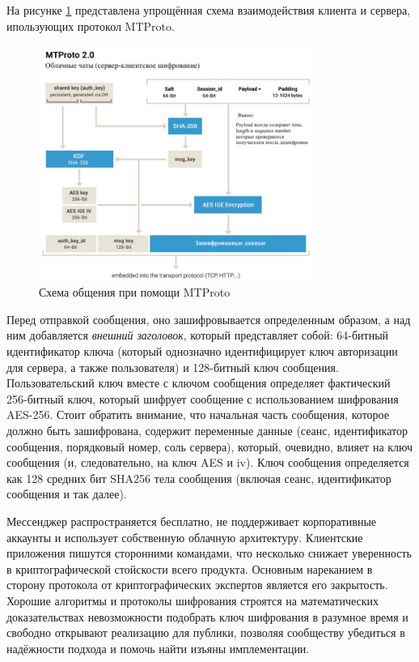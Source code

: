 На рисунке \ref{sec:analysis:research:analogs:telegram:mtproto1} представлена упрощённая схема взаимодействия клиента и сервера, ипользующих протокол MTProto.

\begin{figure}[h]
  \centering
    \includegraphics[width=0.8\textwidth]{inc/img/mtproto1.jpeg}
  \caption{Схема общения при помощи MTProto}
  \label{sec:analysis:research:analogs:telegram:mtproto1}
\end{figure}

Перед отправкой сообщения, оно зашифровывается определенным образом, а над ним добавляется \textit{внешний заголовок}, который представляет собой: 64-битный идентификатор ключа (который однозначно идентифицирует ключ авторизации для сервера, а также пользователя) и 128-битный ключ сообщения. Пользовательский ключ вместе с ключом сообщения определяет фактический 256-битный ключ, который шифрует сообщение с использованием шифрования AES-256. Стоит обратить внимание, что начальная часть сообщения, которое должно быть зашифрована, содержит переменные данные (сеанс, идентификатор сообщения, порядковый номер, соль сервера), который, очевидно, влияет на ключ сообщения (и, следовательно, на ключ AES и iv). Ключ сообщения определяется как 128 средних бит SHA256 тела сообщения (включая сеанс, идентификатор сообщения и так далее).

Мессенджер распространяется бесплатно, не поддерживает корпоративные аккаунты и использует собственную облачную архитектуру. Клиентские приложения пишутся сторонними командами, что несколько снижает уверенность в криптографической стойскости всего продукта. Основным нареканием в сторону протокола от криптографических экспертов является его закрытость. Хорошие алгоритмы и протоколы шифрования строятся на математических доказательствах невозможности подобрать ключ шифрования в разумное время и свободно открывают реализацию для публики, позволяя сообществу убедиться в надёжности подхода и помочь найти изъяны имплементации.